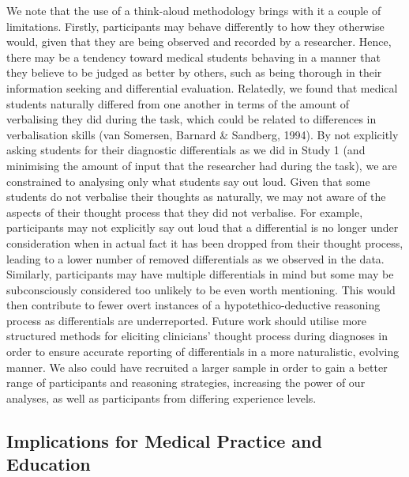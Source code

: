 \documentclass[a4paper, nobind]{templates/ociamthesis}
\begin{document}
We note that the use of a think-aloud methodology brings with it a couple of limitations. Firstly, participants may behave differently to how they otherwise would, given that they are being observed and recorded by a researcher. Hence, there may be a tendency toward medical students behaving in a manner that they believe to be judged as better by others, such as being thorough in their information seeking and differential evaluation. Relatedly, we found that medical students naturally differed from one another in terms of the amount of verbalising they did during the task, which could be related to differences in verbalisation skills (van Somersen, Barnard \& Sandberg, 1994). By not explicitly asking students for their diagnostic differentials as we did in Study 1 (and minimising the amount of input that the researcher had during the task), we are constrained to analysing only what students say out loud. Given that some students do not verbalise their thoughts as naturally, we may not aware of the aspects of their thought process that they did not verbalise. For example, participants may not explicitly say out loud that a differential is no longer under consideration when in actual fact it has been dropped from their thought process, leading to a lower number of removed differentials as we observed in the data. Similarly, participants may have multiple differentials in mind but some may be subconsciously considered too unlikely to be even worth mentioning. This would then contribute to fewer overt instances of a hypotethico-deductive reasoning process as differentials are underreported. Future work should utilise more structured methods for eliciting clinicians' thought process during diagnoses in order to ensure accurate reporting of differentials in a more naturalistic, evolving manner. We also could have recruited a larger sample in order to gain a better range of participants and reasoning strategies, increasing the power of our analyses, as well as participants from differing experience levels.

\subsection*{Implications for Medical Practice and Education}\label{implications-for-medical-practice-and-education}
\end{document}
